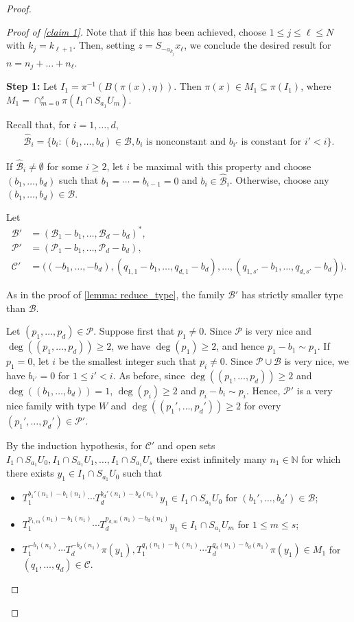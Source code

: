 \documentclass[11pt,reqno]{amsart}
\newcommand{\N}{\mathbb{N}}
\newcommand{\cB}{{\mathcal B}}
\newcommand{\cC}{{\mathcal C}}
\newcommand{\cP}{{\mathcal P}}
\theoremstyle{definition}
\theoremstyle{remark}
\begin{document}
\begin{proof}
\begin{proof}[Proof of \cref{claim 1}]
    Note that if this has been achieved, choose $1\leq j \leq \ell\leq N$ with $k_j = k_{\ell+1}$. Then, setting $z = S_{-a_{k_j}}x_{\ell}$, we conclude the desired result for $n=n_j+\dots+n_\ell$.

    \textbf{Step 1:} Let $I_1 = \pi^{-1}(B(\pi(x),\eta))$. Then $\pi(x)\in M_1\subseteq \pi(I_1)$, where $M_1 = \cap_{m=0}^{s}\pi(I_1\cap S_{a_1}U_m)$.

    Recall that, for $i=1,\dots, d$,\begin{align*}
        \widehat{\cB}_i=\{b_i\colon (b_1,\dots,b_d)\in \cB, b_i \text{ is nonconstant and }  b_{i'} \text{ is constant for } i'<i\}.
    \end{align*}

     If $\widehat{\cB}_i\neq\emptyset$ for some $i\geq 2$, let $i$ be maximal with this property and choose $(b_1,\dots,b_d)$ such that $b_1=\cdots=b_{i-1}=0$ and $b_i\in \widehat{\cB}_i$. Otherwise, choose any $(b_1,\dots,b_d)\in \cB$.
        
    Let \begin{align*}
        \cB' &= (\cB_1 -b_1,\dots,\cB_d-b_d)^*,\\
        \cP' &= (\cP_1 - b_1,\dots,\cP_d-b_d),\\
        \cC' &= \big((-b_1,\dots,-b_d),(q_{1,1}-b_1,\dots,q_{d,1}-b_d),\dots, (q_{1,s'}-b_1,\dots,q_{d,s'}-b_d)\big ).
    \end{align*}

    As in the proof of \cref{lemma: reduce_type}, the family $\cB'$ has strictly smaller type than $\cB$. 
    
    Let $(p_1,\dots,p_d)\in \cP$. Suppose first that $p_1\neq 0$. Since $\cP$ is very nice and $\deg((p_1,\dots,p_d))\geq 2$, we have $\deg(p_1)\geq 2$, and hence $p_1-b_1\sim p_1$. If $p_1=0$, let $i$ be the smallest integer such that $p_i\neq 0$. Since $\cP\cup\cB$ is very nice, we have $b_{i'}=0$ for $1\leq i'< i$. As before, since $\deg((p_1,\dots,p_d))\geq 2$ and $\deg((b_1,\dots,b_d))= 1$, $\deg(p_i)\geq 2$ and $p_i-b_i\sim p_i$. Hence, $\cP'$ is a very nice family with type $W$ and $\deg((p_1',\dots,p_d'))\geq 2$ for every $(p_1',\dots,p_d')\in \cP'$. 

    By the induction hypothesis, for $\cC'$ and open sets $I_1\cap S_{a_1}U_0, I_1\cap S_{a_1}U_1,\dots,I_1\cap S_{a_1}U_s$ there exist infinitely many $n_1\in \N$ for which there exists $y_1 \in I_{1}\cap S_{a_1}U_0$ such that\begin{itemize}
        \item $T_1^{b_1'(n_1)-b_1(n_1)}\cdots T_d^{b_d'(n_1)-b_d(n_1)}y_1\in I_1\cap S_{a_1}U_0$ for $(b_1',\dots,b_d')\in \cB$;
        \item $T_1^{p_{1,m}(n_1)-b_1(n_1)}\cdots T_d^{p_{d,m}(n_1)-b_d(n_1)}y_1\in I_1\cap S_{a_1}U_m$ for $1\leq m \leq s$;
        \item $T_1^{-b_1(n_1)}\cdots T_d^{-b_d(n_1)}\pi(y_1), T_1^{q_1(n_1)-b_1(n_1)}\cdots T_d^{q_d(n_1)-b_d(n_1)}\pi(y_1)\in M_1$ for $(q_1,\dots,q_d)\in \cC$.
    \end{itemize}


\end{proof}
\end{proof}
\end{document}
